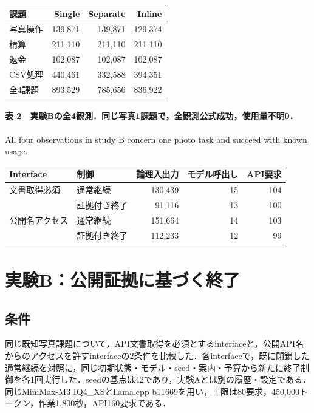 \documentclass{article}
\begin{document}
\begin{tabular}{lrrr}\hline
課題 & Single & Separate & Inline\\\hline
写真操作 & 139,871 & 139,871 & 129,374\\
精算 & 211,110 & 211,110 & 211,110\\
返金 & 102,087 & 102,087 & 102,087\\
CSV処理 & 440,461 & 332,588 & 394,351\\\hline
全4課題 & 893,529 & 785,656 & 836,922\\\hline
\end{tabular}



\paragraph*{表 2　実験Bの全4観測．同じ写真1課題で，全観測公式成功，使用量不明0．}
\noindent All four observations in study B concern one photo task and succeed with known usage.





\begin{tabular}{llrrr}\hline
Interface & 制御 & 論理入出力 & モデル呼出し & API要求\\\hline
文書取得必須 & 通常継続 & 130,439 & 15 & 104\\
 & 証拠付き終了 & 91,116 & 13 & 100\\
公開名アクセス & 通常継続 & 151,664 & 14 & 103\\
 & 証拠付き終了 & 112,233 & 12 & 99\\\hline
\end{tabular}




\section{実験B：公開証拠に基づく終了}
\subsection{条件}
同じ既知写真課題について，API文書取得を必須とするinterfaceと，公開API名からのアクセスを許すinterfaceの2条件を比較した．各interfaceで，既に閉鎖した通常継続を対照に，同じ初期状態・モデル・seed・案内・予算から新たに終了制御を各1回実行した．seedの基点は42であり，実験Aとは別の履歴・設定である．同じMiniMax-M3 IQ4\_XSとllama.cpp b11669を用い，上限は80要求，450,000トークン，作業1,800秒，API160要求である．
\end{document}
